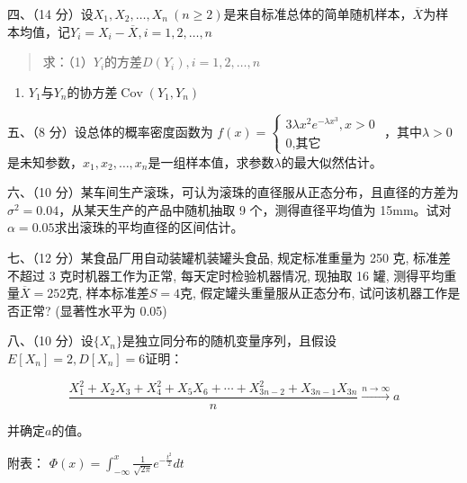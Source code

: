\documentclass[fontset=exam]{exam-zh}
\begin{document}

四、（14 分）设\(X_1,X_2,\ldots,X_n\ (n\geq2)\)是来自标准总体的简单随机样本，\(\overline X\)为样本均值，记\(Y_i=X_i-\overline X,i=1,2,\ldots,n\)

\begin{quote}
求：（1）\(Y_i\)的方差\(D(Y_i),i=1,2,\ldots,n\)
\end{quote}

\begin{enumerate}
\def\labelenumi{\arabic{enumi}.}
\setcounter{enumi}{1}
\item
  \(Y_1\)与\(Y_n\)的协方差\(\operatorname{Cov}(Y_1,Y_n)\)
\end{enumerate}


五、（8 分）设总体的概率密度函数为 \(f(x) = \left\{ \begin{array}{l}
{\text{3}\lambda x^{2}e^{- \lambda x^{3}},x > 0} \\
{0\text{,}\text{其它}}
\end{array} \right.\) ，其中\(\lambda>0\)是未知参数，\(x_1,x_2,\ldots,x_n\)是一组样本值，求参数\(\lambda\)的最大似然估计。


六、（10 分）某车间生产滚珠，可认为滚珠的直径服从正态分布，且直径的方差为\(\sigma^2=0.04\)，从某天生产的产品中随机抽取 9 个，测得直径平均值为 15mm。试对\(\alpha=0.05\)求出滚珠的平均直径的区间估计。


七、（12 分）某食品厂用自动装罐机装罐头食品, 规定标准重量为 250 克, 标准差不超过 3 克时机器工作为正常, 每天定时检验机器情况, 现抽取 16 罐, 测得平均重量\(\overline X=252\)克, 样本标准差\(S=4\)克, 假定罐头重量服从正态分布, 试问该机器工作是否正常? (显著性水平为 0.05)


八、（10 分）设\(\{X_n\}\)是独立同分布的随机变量序列，且假设\(E[X_n]=2,D[X_n]=6\)证明：

\[\frac{X_1^2+X_2X_3+X_4^2+X_5X_6+\cdots+X_{3n-2}^2+X_{3n-1}X_{3n}}n\xrightarrow{n\to\infty}a\]

并确定\(a\)的值。

\newpage
附表： \(\Phi(x) = {\int_{- \infty}^{x}{\frac{1}{\sqrt{2\pi}}e^{- \frac{t^{2}}{2}}dt}}\)
\end{document}
